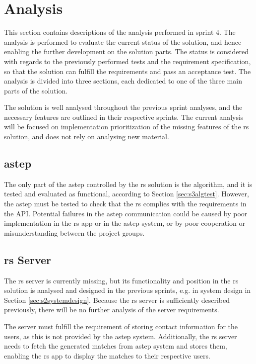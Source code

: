 \section{Analysis}
This section contains descriptions of the analysis performed in sprint 4.
The analysis is performed to evaluate the current status of the solution, and hence enabling the further development on the solution parts.
The status is considered with regards to the previously performed tests and the requirement specification, so that the solution can fulfill the requirements and pass an acceptance test.
The analysis is divided into three sections, each dedicated to one of the three main parts of the solution.

The solution is well analysed throughout the previous sprint analyses, and the necessary features are outlined in their respective sprints.
The current analysis will be focused on implementation prioritization of the missing features of the \gls{rs} solution, and does not rely on analysing new material.


\subsection{\gls{astep}}
The only part of the \gls{astep} controlled by the \gls{rs} solution is the algorithm, and it is tested and evaluated as functional, according to Section \ref{sec:s3algtest}. However, the \gls{astep} must be tested to check that the \gls{rs} complies with the requirements in the API.
Potential failures in the \gls{astep} communication could be caused by poor implementation in the \gls{rs} app or in the \gls{astep} system, or by poor cooperation or misunderstanding between the project groups.


\subsection{\gls{rs} Server}
The \gls{rs} server is currently missing, but its functionality and position in the \gls{rs} solution is analysed and designed in the previous sprints, e.g. in system design in Section \ref{sec:s2systemdesign}. Because the \gls{rs} server is sufficiently described previously, there will be no further analysis of the server requirements.

The server must fulfill the requirement of storing contact information for the users, as this is not provided by the \gls{astep} system.
Additionally, the \gls{rs} server needs to fetch the generated matches from \gls{astep} system and stores them, enabling the \gls{rs} app to display the matches to their respective users.


